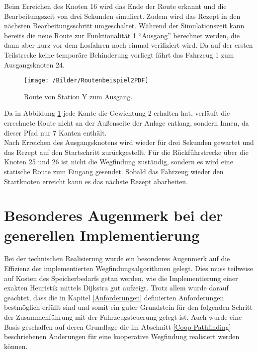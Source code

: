 		Beim Erreichen des Knoten 16 wird das Ende der Route erkannt und die Bearbeitungszeit von drei Sekunden simuliert. Zudem wird das Rezept in den nächsten Bearbeitungsschritt umgeschaltet. Während der Simulationszeit kann bereits die neue Route zur Funktionalität 1 "`Ausgang"' berechnet werden, die dann aber kurz vor dem Losfahren noch einmal verifiziert wird. Da auf der ersten Teilstrecke keine temporäre Behinderung vorliegt fährt das Fahrzeug 1 zum Ausgangsknoten 24.
		
		\begin{figure}[h]
			\centering
			\texttt{[image: /Bilder/Routenbeispiel2PDF]}
			\vspace{0.2cm}
			\caption{Route von Station Y zum Ausgang.}\label{Routenbeispiel2}
		\end{figure}
		
		Da in Abbildung \ref{Routenbeispiel2} jede Kante die Gewichtung 2 erhalten hat, verläuft die errechnete Route nicht an der Außenseite der Anlage entlang, sondern Innen, da dieser Pfad nur 7 Kanten enthält.
		\\[4pt]
		Nach Erreichen des Ausgangsknotens wird wieder für drei Sekunden gewartet und das Rezept auf den Startschritt zurückgestellt. Für die Rückführstrecke über die Knoten 25 und 26 ist nicht die Wegfindung zuständig, sondern es wird eine statische Route zum Eingang gesendet. Sobald das Fahrzeug wieder den Startknoten erreicht kann es das nächste Rezept abarbeiten.
		
		
	\section{Besonderes Augenmerk bei der generellen Implementierung}
		Bei der technischen Realisierung wurde ein besonderes Augenmerk auf die Effizienz der implementierten Wegfindungsalgorithmen gelegt. Dies muss teilweise auf Kosten des Speicherbedarfs getan werden, wie die Implementierung einer exakten Heuristik mittels Dijkstra gut aufzeigt. Trotz allem wurde darauf geachtet, dass die in Kapitel \ref{Anforderungen} definierten Anforderungen bestmöglich erfüllt sind und somit ein guter Grundstein für den folgenden Schritt der Zusammenführung mit der Fahrzeugsteuerung gelegt ist. Auch wurde eine Basis geschaffen auf deren Grundlage die im Abschnitt \ref{Coop Pathfinding} beschriebenen Änderungen für eine kooperative Wegfindung realisiert werden können.